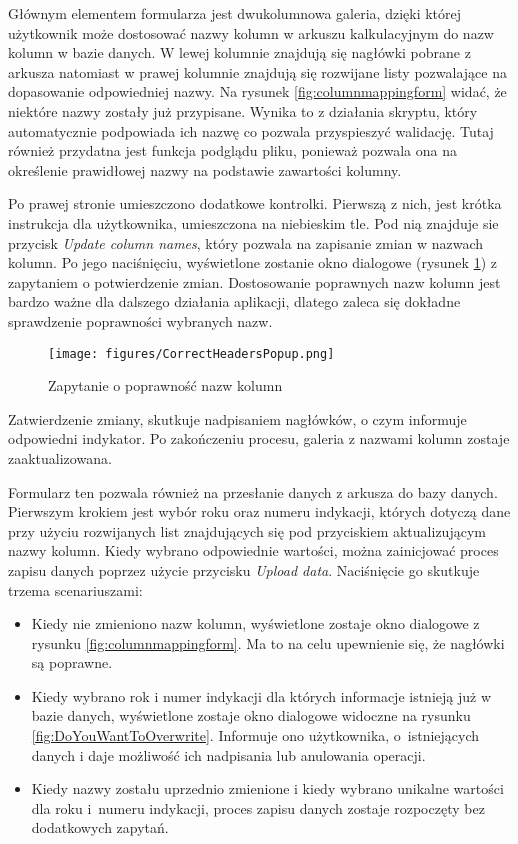 Głównym elementem formularza jest dwukolumnowa galeria, dzięki której użytkownik może dostosować nazwy kolumn w arkuszu kalkulacyjnym do nazw kolumn w bazie danych. W lewej kolumnie znajdują się nagłówki pobrane z arkusza natomiast w prawej kolumnie znajdują się rozwijane listy pozwalające na dopasowanie odpowiedniej nazwy. Na rysunek \ref{fig:columnmappingform} widać, że niektóre nazwy zostały już przypisane. Wynika to z działania skryptu, który automatycznie podpowiada ich nazwę co pozwala przyspieszyć walidację. Tutaj również przydatna jest funkcja podglądu pliku, ponieważ pozwala ona na określenie prawidłowej nazwy na podstawie zawartości kolumny.

Po prawej stronie umieszczono dodatkowe kontrolki. Pierwszą z nich, jest krótka instrukcja dla użytkownika, umieszczona na niebieskim tle.
Pod nią znajduje sie przycisk \emph{Update column names}, który pozwala na zapisanie zmian w nazwach kolumn. Po jego naciśnięciu, wyświetlone zostanie okno dialogowe (rysunek \ref{fig:CorrectHeadersPopup}) z zapytaniem o potwierdzenie zmian. Dostosowanie poprawnych nazw kolumn jest bardzo ważne dla dalszego działania aplikacji, dlatego zaleca się dokładne sprawdzenie poprawności wybranych nazw.
\begin{figure}[h]
    \centering
    \texttt{[image: figures/CorrectHeadersPopup.png]}
    \caption{Zapytanie o poprawność nazw kolumn}
    \label{fig:CorrectHeadersPopup}
\end{figure}
Zatwierdzenie zmiany, skutkuje nadpisaniem nagłówków, o czym informuje odpowiedni indykator. Po zakończeniu procesu, galeria z nazwami kolumn zostaje zaaktualizowana.

Formularz ten pozwala również na przesłanie danych z arkusza do bazy danych. Pierwszym krokiem jest wybór roku oraz numeru indykacji, których dotyczą dane przy użyciu rozwijanych list znajdujących się pod przyciskiem aktualizującym nazwy kolumn. Kiedy wybrano odpowiednie wartości, można zainicjować proces zapisu danych poprzez użycie przycisku \emph{Upload data}. Naciśnięcie go skutkuje trzema scenariuszami:
\begin{itemize}
    \item Kiedy nie zmieniono nazw kolumn, wyświetlone zostaje okno dialogowe z rysunku \ref{fig:columnmappingform}. Ma to na celu upewnienie się, że nagłówki są poprawne.
    \item Kiedy wybrano rok i numer indykacji dla których informacje istnieją już w bazie danych, wyświetlone zostaje okno dialogowe widoczne na rysunku \ref{fig:DoYouWantToOverwrite}. Informuje ono użytkownika, o~istniejących danych i daje możliwość ich nadpisania lub anulowania operacji.
    \item Kiedy nazwy zostału uprzednio zmienione i kiedy wybrano unikalne wartości dla roku i~numeru indykacji, proces zapisu danych zostaje rozpoczęty bez dodatkowych zapytań.
\end{itemize}

